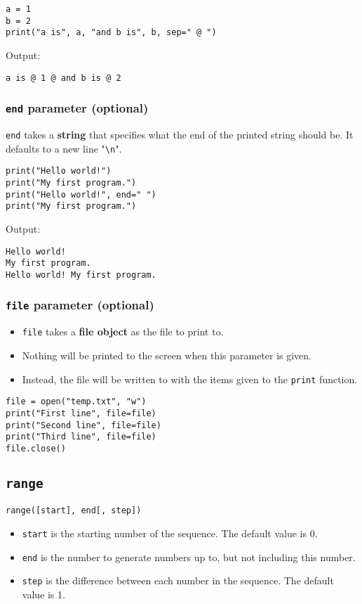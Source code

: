 \documentclass[11pt]{article}
\begin{document}
\begin{verbatim}
a = 1
b = 2
print("a is", a, "and b is", b, sep=" @ ")
\end{verbatim}

 \noindent Output:

\begin{verbatim}
a is @ 1 @ and b is @ 2
\end{verbatim}

\subsubsection{\texttt{end} parameter (optional)}
\label{sec:orgef4f96d}
\texttt{end} takes a \textbf{string} that specifies what the end of the printed string should be. It defaults to a new line "\texttt{\textbackslash{}n}".

\begin{verbatim}
print("Hello world!")
print("My first program.")
print("Hello world!", end=" ")
print("My first program.")
\end{verbatim}

 \noindent Output:

\begin{verbatim}
Hello world!
My first program.
Hello world! My first program.
\end{verbatim}

\subsubsection{\texttt{file} parameter (optional)}
\label{sec:orgc48bf16}
\begin{itemize}
\item \texttt{file} takes a \textbf{file object} as the file to print to.
\item Nothing will be printed to the screen when this parameter is given.
\item Instead, the file will be written to with the items given to the \texttt{print} function.
\end{itemize}
\begin{verbatim}
file = open("temp.txt", "w")
print("First line", file=file)
print("Second line", file=file)
print("Third line", file=file)
file.close()
\end{verbatim}

\subsection{\texttt{range}}
\label{sec:org92b523d}
\texttt{range([start], end[, step])}
\begin{itemize}
\item \texttt{start} is the starting number of the sequence. The default value is 0.
\item \texttt{end} is the number to generate numbers up to, but not including this number.
\item \texttt{step} is the difference between each number in the sequence. The default value is 1.
\end{itemize}
\end{document}

